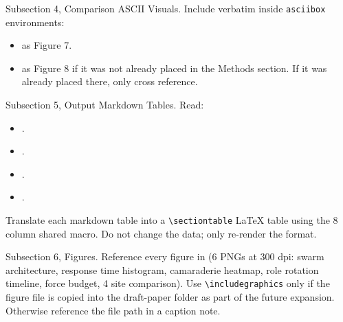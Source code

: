 \begin{sectionaccent}
Subsection 4, Comparison ASCII Visuals. Include verbatim inside
\texttt{asciibox} environments:
\begin{itemize}
  \item {}
        as Figure 7.
  \item {}
        as Figure 8 if it was not already placed in the Methods
        section. If it was already placed there, only cross reference.
\end{itemize}

Subsection 5, Output Markdown Tables. Read:
\begin{itemize}
  \item {}.
  \item {}.
  \item {}.
  \item {}.
\end{itemize}
Translate each markdown table into a \texttt{\textbackslash sectiontable}
LaTeX table using the 8 column shared macro. Do not change the data;
only re-render the format.

Subsection 6, Figures. Reference every figure in
 (6 PNGs at
300 dpi: swarm architecture, response time histogram, camaraderie
heatmap, role rotation timeline, force budget, 4 site comparison).
Use \texttt{\textbackslash includegraphics} only if the figure file is
copied into the draft-paper folder as part of the future expansion.
Otherwise reference the file path in a caption note.


\end{sectionaccent}
